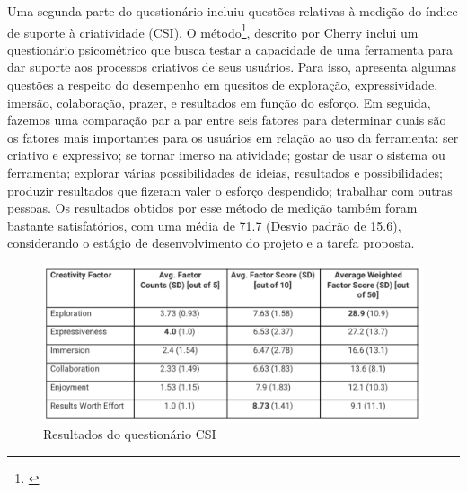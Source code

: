 Uma segunda parte do questionário incluiu questões relativas à medição do índice de suporte à criatividade (CSI). O método\footnote{\cite{Cherry2014}}, descrito por Cherry inclui um questionário psicométrico que busca testar a capacidade de uma ferramenta para dar suporte aos processos criativos de seus usuários. Para isso, apresenta algumas questões a respeito do desempenho em quesitos de exploração, expressividade, imersão, colaboração, prazer, e resultados em função do esforço. Em seguida, fazemos uma comparação par a par entre seis fatores para determinar quais são os fatores mais importantes para os usuários em relação ao uso da ferramenta: ser criativo e expressivo; se tornar imerso na atividade; gostar de usar o sistema ou ferramenta; explorar várias possibilidades de ideias, resultados e possibilidades; produzir resultados que fizeram valer o esforço despendido; trabalhar com outras pessoas. Os resultados obtidos por esse método de medição também foram bastante satisfatórios, com uma média de 71.7 (Desvio padrão de 15.6), considerando o estágio de desenvolvimento do projeto e a tarefa proposta.


\begin{figure}

\includegraphics[width=1\textwidth]{pictures/cap4/CSI}
\caption{Resultados do questionário CSI}
\label{fig:questionnaire}
\end{figure}


 

